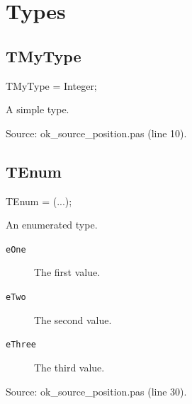 \documentclass{report}
\begin{document}
\section{Types}
\subsection*{TMyType}
\begin{list}{}{
\setlength{\itemindent}{0cm}
\setlength{\listparindent}{0cm}
\setlength{\leftmargin}{\evensidemargin}
\addtolength{\leftmargin}{\tmplength}
\settowidth{\labelsep}{X}
\addtolength{\leftmargin}{\labelsep}
\setlength{\labelwidth}{\tmplength}
}
\begin{flushleft}
\item[\textbf{Declaration}\hfill]
\begin{ttfamily}
TMyType = Integer;\end{ttfamily}


\end{flushleft}
\par
\item[\textbf{Description}]
A simple type.\par
Source: ok{\_}source{\_}position.pas (line 10).

\end{list}
\subsection*{TEnum}
\begin{list}{}{
\setlength{\itemindent}{0cm}
\setlength{\listparindent}{0cm}
\setlength{\leftmargin}{\evensidemargin}
\addtolength{\leftmargin}{\tmplength}
\settowidth{\labelsep}{X}
\addtolength{\leftmargin}{\labelsep}
\setlength{\labelwidth}{\tmplength}
}
\begin{flushleft}
\item[\textbf{Declaration}\hfill]
\begin{ttfamily}
TEnum = (...);\end{ttfamily}


\end{flushleft}
\par
\item[\textbf{Description}]
An enumerated type.\item[\textbf{Values}]
\begin{description}
\item[\texttt{eOne}] The first value.
\item[\texttt{eTwo}] The second value.
\item[\texttt{eThree}] The third value.
\end{description}
\par
Source: ok{\_}source{\_}position.pas (line 30).

\end{list}
\end{document}
